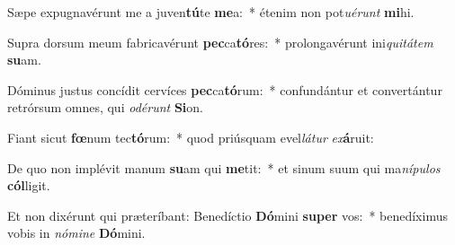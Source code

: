 \item Sæpe expugnavérunt me a juven\textbf{tú}te \textbf{me}a:~* étenim non pot\textit{u}\textit{é}\textit{runt} \textbf{mi}hi.
\item Supra dorsum meum fabricavérunt \textbf{pec}ca\textbf{tó}res:~* prolongavérunt ini\textit{qui}\textit{tá}\textit{tem} \textbf{su}am.
\item Dóminus justus concídit cervíces \textbf{pec}ca\textbf{tó}rum:~* confundántur et convertántur retrórsum omnes, qui \textit{o}\textit{dé}\textit{runt} \textbf{Si}on.
\item Fiant sicut \textbf{fœ}num tec\textbf{tó}rum:~* quod priúsquam evel\textit{lá}\textit{tur} \textit{ex}\textbf{á}ruit:
\item De quo non implévit manum \textbf{su}am qui \textbf{me}tit:~* et sinum suum qui ma\textit{ní}\textit{pu}\textit{los} \textbf{cól}ligit.
\item Et non dixérunt qui præteríbant: Benedíctio \textbf{Dó}mini \textbf{su}\textbf{per} vos:~* benedíximus vobis in \textit{nó}\textit{mi}\textit{ne} \textbf{Dó}mini.
